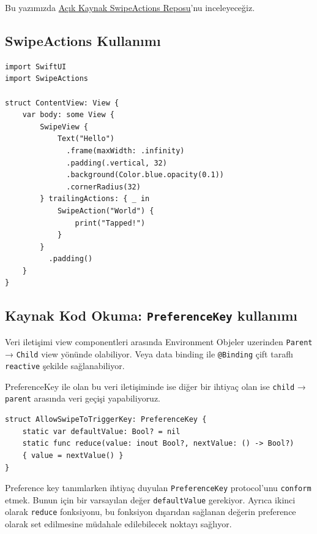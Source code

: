 \documentclass[24pt]{article}
\begin{document}
Bu yazımızda \href{https://github.com/aheze/SwipeActions}{Açık Kaynak SwipeActions Reposu}'nu inceleyeceğiz.

\subsection{SwipeActions Kullanımı}
\label{sec:org279bf97}

\begin{listing}[htbp]
\begin{verbatim}
import SwiftUI
import SwipeActions

struct ContentView: View {
    var body: some View {
        SwipeView {
            Text("Hello")
              .frame(maxWidth: .infinity)
              .padding(.vertical, 32)
              .background(Color.blue.opacity(0.1))
              .cornerRadius(32)
        } trailingActions: { _ in
            SwipeAction("World") {
                print("Tapped!")
            }
        }
          .padding()
    }
}
\end{verbatim}
\caption{Örnek bir swipe aksiyon eklemesi}
\end{listing}

\subsection{Kaynak Kod Okuma: \texttt{PreferenceKey} kullanımı}
\label{sec:orgb6a5470}
Veri iletişimi view componentleri arasında Environment Objeler uzerinden \texttt{Parent} → \texttt{Child} view yönünde olabiliyor.
Veya data binding ile \texttt{@Binding} çift taraflı \texttt{reactive} şekilde sağlanabiliyor.

PreferenceKey ile olan bu veri iletişiminde ise diğer bir ihtiyaç olan ise \texttt{child} → \texttt{parent} arasında veri geçişi yapabiliyoruz.

\begin{listing}[htbp]
\begin{verbatim}
struct AllowSwipeToTriggerKey: PreferenceKey {
    static var defaultValue: Bool? = nil
    static func reduce(value: inout Bool?, nextValue: () -> Bool?)
    { value = nextValue() }
}
\end{verbatim}
\caption{Preference Key tanımlama}
\end{listing}

Preference key tanımlarken ihtiyaç duyulan \texttt{PreferenceKey} protocol'unu \texttt{conform} etmek.
Bunun için bir varsayılan değer \texttt{defaultValue} gerekiyor.
Ayrıca ikinci olarak \texttt{reduce} fonksiyonu, bu fonksiyon dışarıdan sağlanan değerin preference olarak set edilmesine müdahale edilebilecek noktayı sağlıyor.
\end{document}

